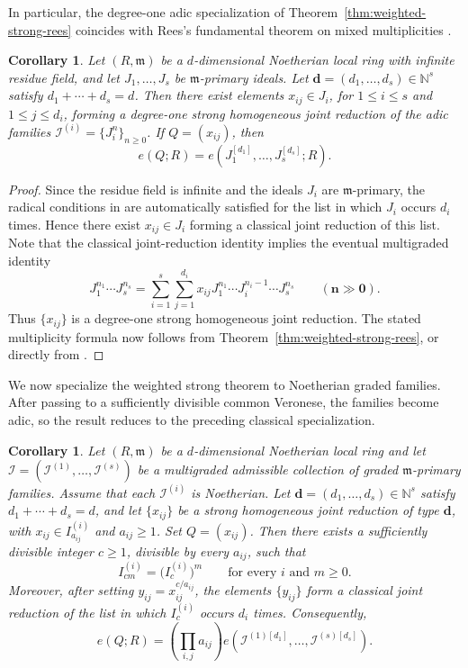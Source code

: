 \documentclass[reqno,12pt]{amsart}
\theoremstyle{plain}
\newtheorem{cor}[prop]{Corollary}
\theoremstyle{definition}
\theoremstyle{remark}
\numberwithin{equation}{section}
\begin{document}
In particular, the degree-one adic specialization of
Theorem~\ref{thm:weighted-strong-rees} coincides with Rees's fundamental
theorem on mixed multiplicities
\cite[Theorem~17.4.9]{SwansonHuneke}.

\begin{cor}
\label{cor:strong-rees-classical}
Let $(R,\mathfrak m)$ be a $d$-dimensional Noetherian local ring with
infinite residue field, and let $J_1,\ldots,J_s$ be
$\mathfrak m$-primary ideals. Let
$\mathbf d=(d_1,\ldots,d_s)\in\mathbb N^s$ satisfy
$d_1+\cdots+d_s=d$. Then there exist elements $x_{ij}\in J_i$, for
$1\leq i\leq s$ and $1\leq j\leq d_i$, forming a degree-one strong
homogeneous joint reduction of the adic families
$\mathcal I^{(i)}=\{J_i^n\}_{n\geq0}$. If $Q=(x_{ij})$, then
\[
e(Q;R)
=
e(J_1^{[d_1]},\ldots,J_s^{[d_s]};R).
\]

\end{cor}

\begin{proof}
Since the residue field is infinite and the ideals $J_i$ are
$\mathfrak m$-primary, the radical conditions in
\cite[Theorem~17.3.1]{SwansonHuneke} are automatically satisfied for
the list in which $J_i$ occurs $d_i$ times. Hence there exist
$x_{ij}\in J_i$ forming a classical joint reduction of this list. Note that  the classical joint-reduction identity implies the
eventual multigraded identity
\[
J_1^{n_1}\cdots J_s^{n_s}
=
\sum_{i=1}^s\sum_{j=1}^{d_i}
x_{ij}
J_1^{n_1}\cdots J_i^{n_i-1}\cdots J_s^{n_s}
\qquad(\mathbf n\gg\mathbf0).
\]
Thus $\{x_{ij}\}$ is a degree-one strong homogeneous joint reduction.
The stated multiplicity formula now follows from
Theorem~\ref{thm:weighted-strong-rees}, or directly from
\cite[Theorem~17.4.9]{SwansonHuneke}.
\end{proof}

We now specialize the weighted strong theorem to Noetherian graded
families. After passing to a sufficiently divisible common Veronese,
the families become adic, so the result reduces to the preceding
classical specialization.

\begin{cor}
\label{cor:weighted-strong-rees-noetherian}
Let $(R,\mathfrak m)$ be a $d$-dimensional Noetherian local ring and let
$\boldsymbol{\mathcal I}
=(\mathcal I^{(1)},\ldots,\mathcal I^{(s)})$
be a multigraded admissible collection of graded
$\mathfrak m$-primary families. Assume that each
$\mathcal I^{(i)}$ is Noetherian.
Let $\mathbf d=(d_1,\ldots,d_s)\in\mathbb N^s$ satisfy
$d_1+\cdots+d_s=d$, and let $\{x_{ij}\}$ be a strong homogeneous joint
reduction of type $\mathbf d$, with
$x_{ij}\in I_{a_{ij}}^{(i)}$ and $a_{ij}\geq1$. Set $Q=(x_{ij})$.
Then there exists a sufficiently divisible integer $c\geq1$, divisible
by every $a_{ij}$, such that
\[
I_{cm}^{(i)}=\bigl(I_c^{(i)}\bigr)^m
\qquad
\text{for every }i\text{ and }m\geq0.
\]
Moreover, after setting $y_{ij}=x_{ij}^{c/a_{ij}}$, the elements
$\{y_{ij}\}$ form a classical joint reduction of the list in which
$I_c^{(i)}$ occurs $d_i$ times. Consequently,
\[
e(Q;R)
=
\left(\prod_{i,j}a_{ij}\right)
e\!\left(
\mathcal I^{(1)[d_1]},\ldots,
\mathcal I^{(s)[d_s]}
\right).
\]
\end{cor}
\end{document}
